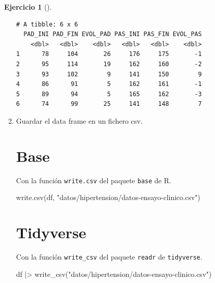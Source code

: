 \documentclass[
  a4paper,
]{scrreport}
\newenvironment{Shaded}{\begin{snugshade}}{\end{snugshade}}
\newcommand{\FunctionTok}[1]{\textcolor[rgb]{0.28,0.35,0.67}{#1}}
\newcommand{\NormalTok}[1]{\textcolor[rgb]{0.00,0.23,0.31}{#1}}
\newcommand{\SpecialCharTok}[1]{\textcolor[rgb]{0.37,0.37,0.37}{#1}}
\newcommand{\StringTok}[1]{\textcolor[rgb]{0.13,0.47,0.30}{#1}}
\theoremstyle{definition}
\newtheorem{exercise}{Ejercicio}[chapter]
\theoremstyle{remark}
\begin{document}
\begin{exercise}[]
\begin{enumerate}
\begin{tcolorbox}
\begin{verbatim}
# A tibble: 6 x 6
  PAD_INI PAD_FIN EVOL_PAD PAS_INI PAS_FIN EVOL_PAS
    <dbl>   <dbl>    <dbl>   <dbl>   <dbl>    <dbl>
1      78     104       26     176     175       -1
2      95     114       19     162     160       -2
3      93     102        9     141     150        9
4      86      91        5     162     161       -1
5      89      94        5     165     162       -3
6      74      99       25     141     148        7
\end{verbatim}

  \end{tcolorbox}
\item
  Guardar el data frame en un fichero csv.

  \begin{tcolorbox}[enhanced jigsaw, breakable, toptitle=1mm, colbacktitle=quarto-callout-tip-color!10!white, rightrule=.15mm, opacityback=0, opacitybacktitle=0.6, titlerule=0mm, coltitle=black, colframe=quarto-callout-tip-color-frame, colback=white, bottomtitle=1mm, leftrule=.75mm, toprule=.15mm, title=\textcolor{quarto-callout-tip-color}{\faLightbulb}\hspace{0.5em}{Solución}, arc=.35mm, bottomrule=.15mm, left=2mm]

  \section{Base}

  Con la función \texttt{write.csv} del paquete \texttt{base} de R.

\begin{Shaded}
\begin{Highlighting}[]
\FunctionTok{write.csv}\NormalTok{(df, }\StringTok{"datos/hipertension/datos{-}ensayo{-}clinico.csv"}\NormalTok{)}
\end{Highlighting}
\end{Shaded}

  \section{Tidyverse}

  Con la función \texttt{write\_csv} del paquete \texttt{readr} de
  \texttt{tidyverse}.

\begin{Shaded}
\begin{Highlighting}[]
\NormalTok{df  }\SpecialCharTok{|\textgreater{}} \FunctionTok{write\_csv}\NormalTok{(}\StringTok{"datos/hipertension/datos{-}ensayo{-}clinico.csv"}\NormalTok{)}
\end{Highlighting}
\end{Shaded}

  \end{tcolorbox}
\end{enumerate}

\end{exercise}
\end{document}
